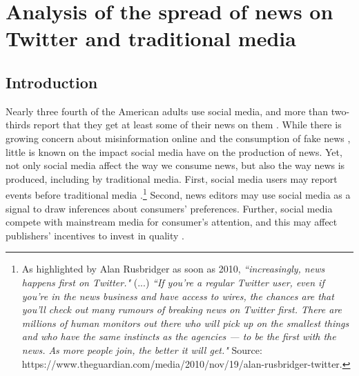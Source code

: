 \chapter{Analysis of the spread of news on Twitter and traditional media}

\section{Introduction\label{Sec:Introduction}}

Nearly three fourth of the American adults use social media, and more than two-thirds report that they get at least some of their news on them \citep{Pew2018_SocialMediaFactSheet,Pew2019_MobileTechnololy}. While there is growing concern about misinformation online and the consumption of fake news \citep{AllcottGentzkow2017,AllcottGentzkowYu2019_ReasearchPolitics}, little is known on the impact social media have on the production of news. Yet, not only social media affect the way we consume news, but also the way news is produced, including by traditional media. First, social media users may report events before traditional media \citep{Sakakietal2010}.\footnote{As highlighted by Alan Rusbridger as soon as 2010, \textit{``increasingly, news happens first on Twitter."} (...) \textit{``If you're a regular Twitter user, even if you're in the news business and have access to wires, the chances are that you'll check out many rumours of breaking news on Twitter first. There are millions of human monitors out there who will pick up on the smallest things and who have the same instincts as the agencies — to be the first with the news. As more people join, the better it will get."} Source: https://www.theguardian.com/media/2010/nov/19/alan-rusbridger-twitter.} Second, news editors may use social media as a signal to draw inferences about consumers' preferences. Further, social media compete with mainstream media for consumer's attention, and this may affect publishers' incentives to invest in quality \citep{deCorniereSarvary2019}.

